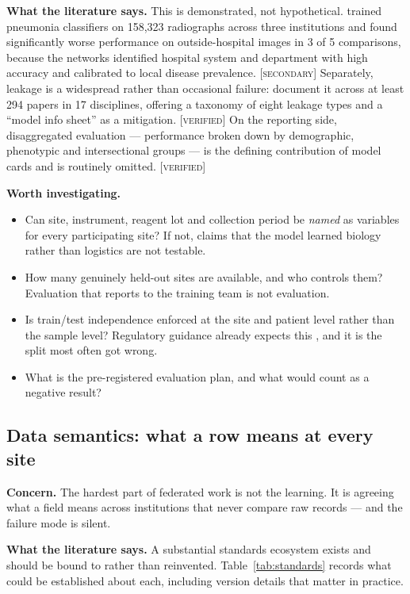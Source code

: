 \documentclass[11pt,a4paper]{article}
\newcommand{\verified}{\textsc{[verified]}}
\newcommand{\secondary}{\textsc{[secondary]}}
\newcommand{\concern}[1]{\par\medskip\noindent\textbf{Concern.} #1}
\newcommand{\evidence}[1]{\par\smallskip\noindent\textbf{What the literature says.} #1}
\newcommand{\investigate}{\par\smallskip\noindent\textbf{Worth investigating.}}
\begin{document}
\evidence{This is demonstrated, not hypothetical. \citet{zech2018variable}
trained pneumonia classifiers on 158,323 radiographs across three
institutions and found significantly worse performance on outside-hospital
images in 3 of 5 comparisons, because the networks identified hospital
system and department with high accuracy and calibrated to local disease
prevalence. \secondary{} Separately, leakage is a widespread rather than
occasional failure: \citet{kapoor2023leakage} document it across at least
294 papers in 17 disciplines, offering a taxonomy of eight leakage types and
a ``model info sheet'' as a mitigation. \verified{} On the reporting side,
disaggregated evaluation --- performance broken down by demographic,
phenotypic and intersectional groups --- is the defining contribution of
model cards \citep{mitchell2019model} and is routinely omitted. \verified}

\investigate
\begin{itemize}
  \item Can site, instrument, reagent lot and collection period be
  \emph{named} as variables for every participating site? If not, claims
  that the model learned biology rather than logistics are not testable.
  \item How many genuinely held-out sites are available, and who controls
  them? Evaluation that reports to the training team is not evaluation.
  \item Is train/test independence enforced at the site and patient level
  rather than the sample level? Regulatory guidance already expects this
  \citep{gmlp2021}, and it is the split most often got wrong.
  \item What is the pre-registered evaluation plan, and what would count as
  a negative result?
\end{itemize}

\subsection{Data semantics: what a row means at every site}
\label{sec:semantics}

\concern{The hardest part of federated work is not the learning. It is
agreeing what a field means across institutions that never compare raw
records --- and the failure mode is silent.}

\evidence{A substantial standards ecosystem exists and should be bound to
rather than reinvented. Table~\ref{tab:standards} records what could be
established about each, including version details that matter in practice.}
\end{document}

